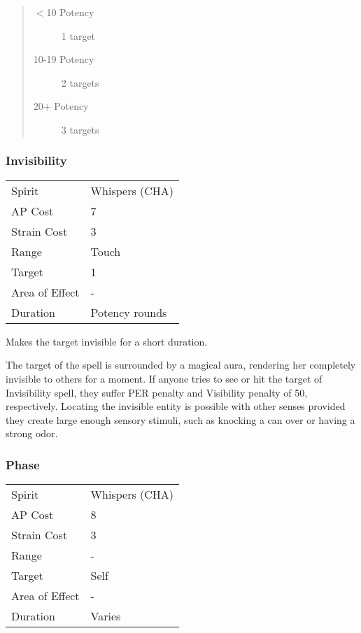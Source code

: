 \documentclass[11pt,a4paper,twocolumn]{book}
\begin{document}
\begin{quote}
	\begin{description}
		\item[$<$10 Potency] 	1 target
		\item[10-19 Potency] 	2 targets
		\item[20+ Potency]  	3 targets
	\end{description}	
\end{quote}



\subsubsection*{Invisibility}
{
	\begin{tabu} to 75mm{| X[l,4] | X[l,7] |}
		\hline
		Spirit         & Whispers (CHA) \\
		AP Cost        & 7              \\
		Strain Cost    & 3              \\
		Range          & Touch          \\
		Target         & 1              \\
		Area of Effect & -              \\
		Duration       & Potency rounds \\ \hline
	\end{tabu}
	
}

\medskip

Makes the target invisible for a short duration.

The target of the spell is surrounded by a magical aura, rendering her completely invisible to others for a moment. If anyone tries to see or hit the target of Invisibility spell, they suffer PER penalty and Visibility penalty of 50, respectively. Locating the invisible entity is possible with other senses provided they create large enough sensory stimuli, such as knocking a can over or having a strong odor.



\subsubsection*{Phase}
{
	\begin{tabu} to 75mm{| X[l,4] | X[l,7] |}
		\hline
		Spirit         & Whispers (CHA) \\
		AP Cost        & 8                   \\
		Strain Cost    & 3                   \\
		Range          & -         \\
		Target         & Self            \\
		Area of Effect & -                   \\
		Duration       & Varies              \\ \hline
	\end{tabu}
	
}
\end{document}
